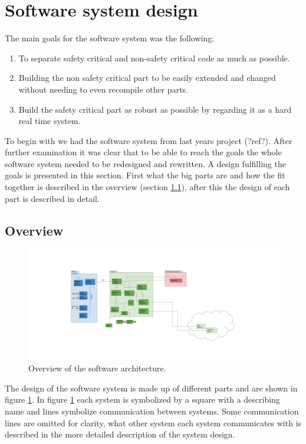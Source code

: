 \documentclass[main.tex]{subfiles}
\begin{document}
\section{Software system design}

The main goals for the software system was the following:
\begin{enumerate}
    \item To separate safety critical and non-safety critical code as much as possible.
    \item Building the non safety critical part to be easily extended and changed without needing to even recompile other parts.
    \item Build the safety critical part as robust as possible by regarding it as a hard real time system.
\end{enumerate}


To begin with we had the software system from last years project (?ref?).
After further examination it was clear that to be able to reach the goals the whole software system
needed to be redesigned and rewritten. A design fulfilling the goals is presented in this section.
First what the big parts are and how the fit together is described in the overview (section \ref{sec:sw_design_overview}),
after this the design of each part is described in detail.

\subsection{Overview}
\label{sec:sw_design_overview}

\begin{figure}[H]
    \includegraphics[width=\textwidth]{software_overview.png}
    \caption{Overview of the software architecture.}
    \label{fig:software_overview}
\end{figure}

The design of the software system is made up of different parts and are shown in figure \ref{fig:software_overview}. 
In figure \ref{fig:software_overview} each system is symbolized by a square with a describing name and
lines symbolize communication between systems. Some communication lines are omitted for clarity, what other system each system communicates with is described in the more detailed description of the system design.
\end{document}
